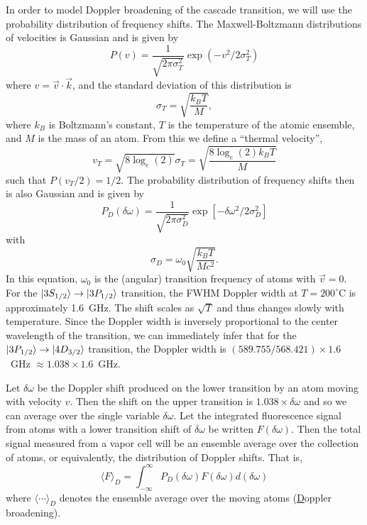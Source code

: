 In order to model Doppler broadening of the cascade transition, we will
use the probability distribution of frequency shifts.  The
Maxwell-Boltzmann distributions of velocities is Gaussian and is given
by 
\begin{equation}
P(v) = \frac{1}{\sqrt{2 \pi \sigma_{T}^2}} \exp\left(-v^2/2 \sigma_T^2 \right)
\end{equation}
where $v = \vec{v} \cdot \vec{k}$, and the standard deviation of this
distribution is
\begin{equation}
\sigma_T = \sqrt{\frac{k_B T}{M}},
\end{equation}
where $k_B$ is Boltzmann's constant, $T$ is the temperature of the atomic
ensemble, and $M$ is the mass of an atom.  From this we define a ``thermal
velocity'',
\begin{equation}
v_T = \sqrt{8 \log_e(2)} \sigma_T = \sqrt{\frac{8 \log_e(2) k_B T}{M}}
\label{thermal_v}
\end{equation}
such that $P(v_T/2) = 1/2$. The probability distribution of frequency shifts then
is also Gaussian and is given by
\cite{Loudon_book}
\begin{equation}
P_D(\delta\omega) =
\frac{1}{\sqrt{2\pi\sigma_D^2}}\exp\left[-\delta\omega^2/2\sigma_D^2\right]
\end{equation}
with
\begin{equation}
\sigma_D = \omega_0 \sqrt{\frac{k_B T}{M c^2}}.
\end{equation}
In this equation, $\omega_0$ is the (angular) transition frequency of atoms with
$\vec{v} =0$.  For the $\vert 3S_{1/2} \rangle \rightarrow
\vert 3P_{1/2} \rangle$ transition, the FWHM Doppler width at $T=200^{\circ}$C is
approximately 1.6~GHz.  The shift scales as $\sqrt{T}$ and thus changes slowly
with temperature.  Since the Doppler width is inversely
proportional to the center wavelength of the transition, we can immediately
infer that for the $\vert 3P_{1/2} \rangle \rightarrow \vert 4D_{3/2} \rangle$ transition, the
Doppler width is $(589.755/568.421)\times1.6$~GHz $\approx 1.038 \times
1.6$~GHz.

Let $\delta\omega$ be the Doppler shift produced on the lower transition
by an atom moving with velocity $v$.  Then the shift on the upper transition is
$1.038 \times \delta\omega$ and so we can average over the single variable
$\delta\omega$.  Let the integrated fluorescence signal from atoms
with a lower transition shift of $\delta\omega$ be written
$F(\delta\omega)$. Then the total signal measured from a vapor cell will be an
ensemble average over the collection of atoms, or equivalently, the
distribution of Doppler shifts.  That is,
\begin{equation}
\langle F \rangle_D = \int_{-\infty}^{\infty}P_D(\delta\omega)
F(\delta\omega) d(\delta\omega)
\label{dopp_eq}
\end{equation}
where $\langle \cdots \rangle_D$ denotes the ensemble average over the
moving atoms (\underline{D}oppler broadening).

